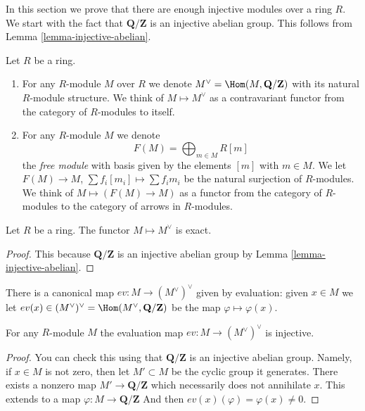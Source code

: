 \noindent
In this section we prove that there are enough injective modules over a ring
$R$. We start with the fact that $\mathbf{Q}/\mathbf{Z}$ is an injective
abelian group. This follows from Lemma \ref{lemma-injective-abelian}.

\begin{definition}
\label{definition-simple-functors}
Let $R$ be a ring.
\begin{enumerate}
\item For any $R$-module $M$ over $R$ we denote
$M^\vee = \Hom(M, \mathbf{Q}/\mathbf{Z})$
with its natural $R$-module structure. We think
of {\it $M \mapsto M^\vee$} as a contravariant functor
from the category of $R$-modules to itself.
\item For any $R$-module $M$ we denote
$$
F(M) = \bigoplus\nolimits_{m \in M} R[m]
$$
the {\it free module} with basis given by the elements $[m]$ with
$m \in M$. We let $F(M)\to M$, $\sum f_i [m_i] \mapsto \sum f_i m_i$
be the natural surjection of $R$-modules.
We think of $M \mapsto (F(M) \to M)$ as a functor from
the category of $R$-modules to the category of
arrows in $R$-modules.
\end{enumerate}
\end{definition}

\begin{lemma}
\label{lemma-vee-exact}
Let $R$ be a ring.
The functor $M \mapsto M^\vee$ is exact.
\end{lemma}

\begin{proof}
This because $\mathbf{Q}/\mathbf{Z}$
is an injective abelian group by Lemma \ref{lemma-injective-abelian}.
\end{proof}

\noindent
There is a canonical map $ev : M \to (M^\vee)^\vee$
given by evaluation: given $x \in M$ we let
$ev(x) \in (M^\vee)^\vee = \Hom(M^\vee, \mathbf{Q}/\mathbf{Z})$
be the map $\varphi \mapsto \varphi(x)$.

\begin{lemma}
\label{lemma-ev-injective}
For any $R$-module $M$ the evaluation map
$ev : M \to (M^\vee)^\vee$ is injective.
\end{lemma}

\begin{proof}
You can check this using that $\mathbf{Q}/\mathbf{Z}$ is an injective
abelian group. Namely, if $x \in M$ is not zero, then let
$M' \subset M$ be the cyclic group it generates. There exists
a nonzero map $M' \to \mathbf{Q}/\mathbf{Z}$ which necessarily does
not annihilate $x$. This extends to
a map $\varphi : M \to \mathbf{Q}/\mathbf{Z}$
And then $ev(x)(\varphi) = \varphi(x) \not = 0$.
\end{proof}

